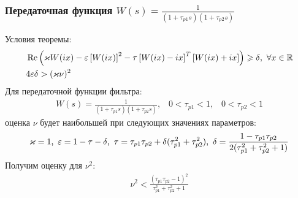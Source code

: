 \documentclass{beamer}
\begin{document}
\begin{frame}
\frametitle{Передаточная функция $W(s) = \frac{1}{(1+\tau_{p1}s)(1+\tau_{p2}s)}$}
Условия теоремы:\vspace{-2mm}
 \begin{align*}
&\operatorname{Re}\left( \varkappa W(ix)- \varepsilon\left[W(ix)\right]^2-\tau\left[ W(ix)-ix \right]^T\left[W(ix)+ix \right]\right) \geqslant \delta \text{,}\enskip\forall x \in \mathbb{R}\\
&4\varepsilon\delta > (\varkappa\nu)^2
\end{align*}
Для передаточной функции фильтра:
 \begin{equation}\label{filter1}
 \begin{aligned}
W(s) = \frac{1}{(1+\tau_{p1}s)(1+\tau_{p2}s)}\text{,} \quad0 < \tau_{p1} < 1 \text{,} \quad 0 < \tau_{p2} <1
 \end{aligned}
\end{equation}
оценка $\nu$ будет наибольшей при следующих значениях параметров:
 \begin{equation*}
 \begin{aligned}
\varkappa = 1 \text{,} \enskip  \varepsilon = 1 - \tau - \delta \text{,} \enskip \tau = \tau_{p1}\tau_{p2} + \delta(\tau_{p1}^2+\tau_{p2}^2) \text{,} \enskip \delta = \frac{1-\tau_{p1}\tau_{p2}}{2(\tau_{p1}^2+\tau_{p2}^2 + 1)}
 \end{aligned}
\end{equation*}
Получим оценку для $\nu^2$:
\begin{equation}
 \begin{aligned}
\nu^2 < \frac{(\tau_{p1}\tau_{p2} - 1)^2}{\tau_{p1}^2 + \tau_{p2}^2 + 1}
 \end{aligned}
\end{equation}
\end{frame}

\end{document}
